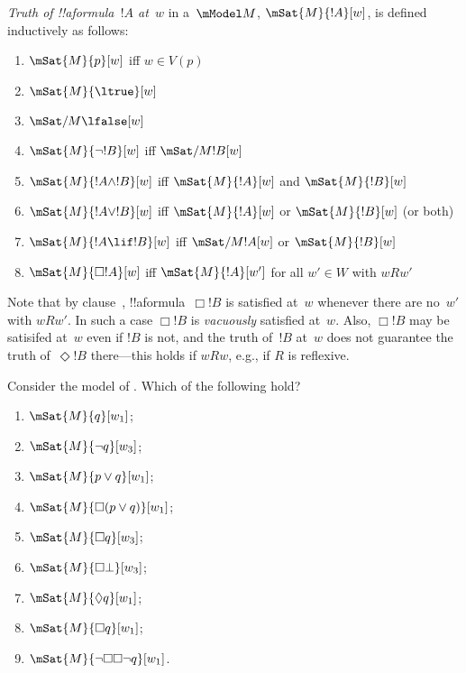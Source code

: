 \documentclass[../../../include/open-logic-section]{subfiles}
\begin{document}


\begin{defn}
  \emph{Truth of !!a{formula}~$!A$ at~$w$} in a~$\mModel M$,
  $\mSat{M}{!A}[w]$, is defined inductively as follows:
  \begin{enumerate}
  \item $\mSat{M}{p}[w]$ iff $w \in V(p)$
  \item $\mSat{M}{\ltrue}[w]$
  \item $\mSat/{M}{\lfalse}[w]$
  \item $\mSat{M}{\lnot !B}[w]$ iff $\mSat/{M}{!B}[w]$
  \item $\mSat{M}{!A \land !B}[w]$ iff $\mSat{M}{!A}[w]$ and
    $\mSat{M}{!B}[w]$
  \item $\mSat{M}{!A \lor !B}[w]$ iff $\mSat{M}{!A}[w]$ or
    $\mSat{M}{!B}[w]$ (or both)
  \item $\mSat{M}{!A \lif !B}[w]$ iff $\mSat/{M}{!A}[w]$ or
    $\mSat{M}{!B}[w]$
  \item{} $\mSat{M}{\Box !A}[w]$ iff
    $\mSat{M}{!A}[w']$ for all $w' \in W$ with $wRw'$
  \end{enumerate} 
\end{defn}

Note that by clause~, !!a{formula}~$\Box
!B$ is satisfied at~$w$ whenever there are no~$w'$ with $wRw'$. In
such a case $\Box !B$ is \emph{vacuously} satisfied at~$w$. Also,
$\Box !B$ may be satisifed at~$w$ even if $!B$ is not, and the truth
of~$!B$ at~$w$ does not guarantee the truth of~$\Diamond !B$
there---this holds if $wRw$, e.g., if $R$ is reflexive.

\begin{prob}
  Consider the model of . Which of the
  following hold?
    \begin{enumerate}
    \item $\mSat{M}{q}[w_1]$;
    \item $\mSat{M}{\lnot q}[w_3]$;
    \item $\mSat{M}{p \lor q}[w_1]$;
    \item $\mSat{M}{\Box (p \lor q)}[w_1]$;
    \item $\mSat{M}{\Box q}[w_3]$;
    \item $\mSat{M}{\Box \bot}[w_3]$;
    \item $\mSat{M}{\Diamond q}[w_1]$;
    \item $\mSat{M}{\Box q}[w_1]$;
    \item $\mSat{M}{\lnot \Box\Box \lnot q}[w_1]$. 
    \end{enumerate}
\end{prob}
\end{document}
